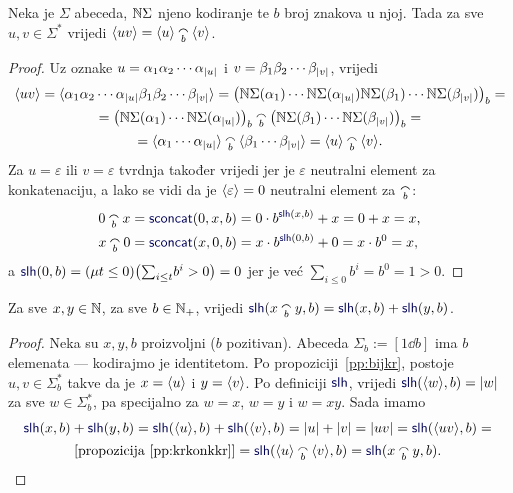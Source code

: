 \begin{propozicija}[{name=[prateća funkcija konkatenacije nad $\Sigma$]}]\label{pp:krkonkkr}
Neka je $\Sigma$ abeceda, ${\mathbb N}\Sigma$ njeno kodiranje te $b$ broj znakova u njoj. Tada za sve $u,v\in\Sigma^*$ vrijedi
    $\kr{uv}=\kr u\conc b\kr v$.
\end{propozicija}
\begin{proof}
Uz oznake $u=\alpha_1\alpha_2\dotsm\alpha_{\lvert u\rvert}$ i $v=\beta_1\beta_2\dotsm\beta_{\lvert v\rvert}$, vrijedi
\begin{multline}
\kr{uv}=\kr{\alpha_1\alpha_2\dotsm\alpha_{\dulj u}\beta_1\beta_2\dotsm\beta_{\dulj v}}=\bigl(
\N\Sigma(\alpha_1)
\dotsm
\N\Sigma(\alpha_{\dulj u})
\N\Sigma(\beta_1)
\dotsm
\N\Sigma(\beta_{\dulj v})
\bigr)_b=\\
=\bigl(
\N\Sigma(\alpha_1)
\dotsm
\N\Sigma(\alpha_{\dulj u})
\bigr)_b\conc b\bigl(
\N\Sigma(\beta_1)
\dotsm
\N\Sigma(\beta_{\dulj v})
\bigr)_b=\\
=\kr{\alpha_1\dotsm\alpha_{\dulj u}}\conc b\kr{\beta_1\dotsm\beta_{\dulj v}}=\kr u\conc b\kr v\text.
\end{multline}
Za $u=\varepsilon$ ili $v=\varepsilon$ tvrdnja također vrijedi jer je $\varepsilon$ neutralni element za konkatenaciju, a lako se vidi da je $\langle\varepsilon\rangle=0$ neutralni element za $\conc b$:
\begin{align}
    0\conc bx&=\f{sconcat}(0,x,b)=0\cdot b^{\f{slh}(x,b)}+x=0+x=x\text,\\
    x\conc b0&=\f{sconcat}(x,0,b)=x\cdot b^{\f{slh}(0,b)}+0=x\cdot b^0=x\text,
\end{align}
a $\f{slh}(0,b)=(\mu t\le 0)\bigl(\sum_{i\le t}\!b^i>0\bigr)=0$ jer je već $\sum_{i\le0}b^i=b^0=1>0$.
\end{proof}

\begin{korolar}[{name=[duljina konkatenacije je zbroj duljina]}]\label{kor:lhkonk=lh+lh}
Za sve $x,y\in{\mathbb N}$, za sve $b\in{\mathbb N}_+$, vrijedi $\f{slh}(x\conc b y,b)=\f{slh}(x,b)+\f{slh}(y,b)$.
\end{korolar}
\begin{proof}
Neka su $x,y,b$ proizvoljni ($b$ pozitivan). Abeceda $\Sigma_b:=[1\dd b]$ ima $b$ elemenata --- kodirajmo je identitetom.
Po propoziciji~\ref{pp:bijkr}, postoje $u,v\in\Sigma_b^*$ takve da je $x=\langle u\rangle$ i $y=\langle v\rangle$. Po definiciji $\f{slh}$, vrijedi $\f{slh}(\kr w,b)=\dulj w$ za sve $w\in\Sigma_b^*$, pa specijalno za $w=x$, $w=y$ i $w=xy$. Sada imamo
\begin{multline}
    \f{slh}(x,b)+\f{slh}(y,b)=
    \f{slh}(\kr u,b)+\f{slh}(\kr v,b)=
    \dulj u+\dulj v=
    \dulj{uv}=
    \f{slh}(\kr{uv},b)={}\\
    \text{[propozicija \ref{pp:krkonkkr}]}{}=\f{slh}(\kr u\conc b\kr v,b)=
    \f{slh}(x\conc b y,b)\text{.\;\qedhere}
\end{multline}
\end{proof}

